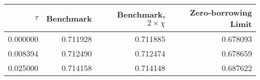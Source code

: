 \begin{tabular}{rrrr}
\toprule
   $\tau$ &  Benchmark &  Benchmark, $2 \times \chi$ &  Zero-borrowing Limit \\
\midrule
 0.000000 &   0.711928 &                    0.711885 &              0.678093 \\
 0.008394 &   0.712490 &                    0.712474 &              0.678659 \\
 0.025000 &   0.714158 &                    0.714148 &              0.687622 \\
\bottomrule
\end{tabular}
